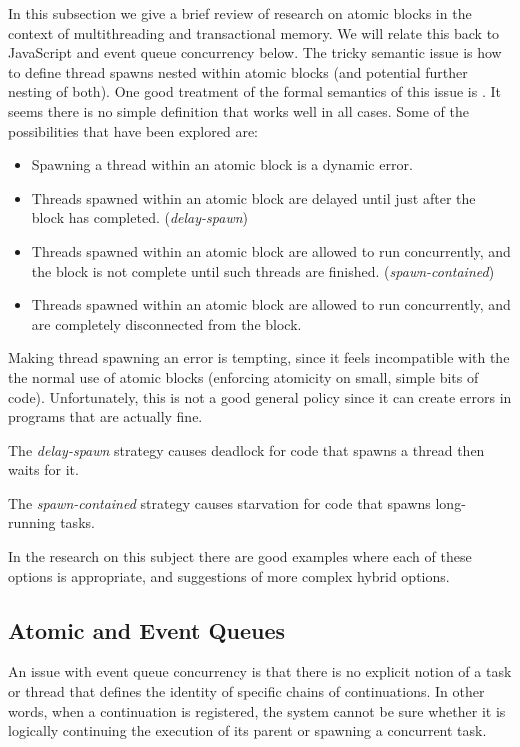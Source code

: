 \documentclass[acmsmall,anonymous,review]{acmart}\settopmatter{printfolios=true,printccs=false,printacmref=false}
\begin{document}
In this subsection we give a brief review of research on atomic blocks in the context of multithreading and transactional memory.
We will relate this back to JavaScript and event queue concurrency below.
The tricky semantic issue is how to define thread spawns nested within atomic blocks (and potential further nesting of both).
One good treatment of the formal semantics of this issue is \cite{Moore2008}.
It seems there is no simple definition that works well in all cases.
Some of the possibilities that have been explored are:
\begin{itemize}
\item Spawning a thread within an atomic block is a dynamic error.
\item Threads spawned within an atomic block are delayed until just after the block has completed. (\emph{delay-spawn})
\item Threads spawned within an atomic block are allowed to run concurrently, and the block is not complete until such threads are finished. (\emph{spawn-contained})
\item Threads spawned within an atomic block are allowed to run concurrently, and are completely disconnected from the block.
\end{itemize}

Making thread spawning an error is tempting, since it feels incompatible with the the normal use of atomic blocks (enforcing atomicity on small, simple bits of code).
Unfortunately, this is not a good general policy since it can create errors in programs that are actually fine.

The \emph{delay-spawn} strategy causes deadlock for code that spawns a thread then waits for it.

The \emph{spawn-contained} strategy causes starvation for code that spawns long-running tasks.



In the research on this subject there are good examples where each of these options is appropriate, and suggestions of more complex hybrid options.

\subsection{Atomic and Event Queues}

An issue with event queue concurrency is that there is no explicit notion of a task or thread that defines the identity of specific chains of continuations.
In other words, when a continuation is registered, the system cannot be sure whether it is logically continuing the execution of its parent or spawning a concurrent task.
\end{document}
